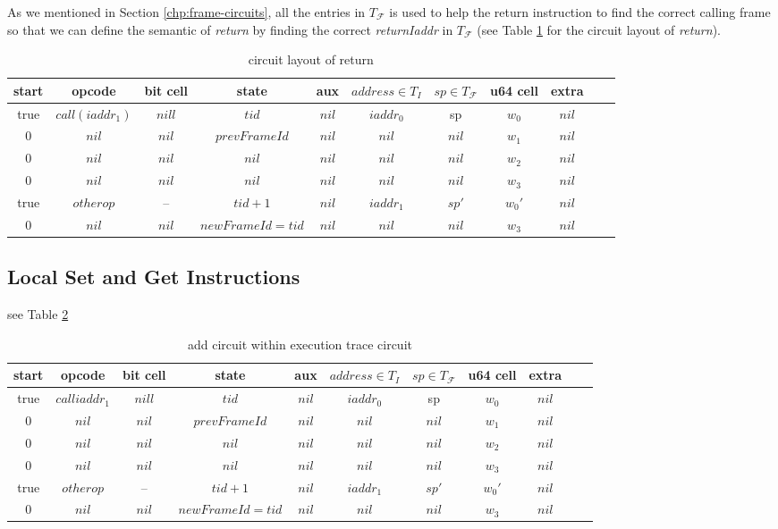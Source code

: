  As we mentioned in Section \ref{chp:frame-circuits}, all the entries in $T_\mathcal{F}$ is used to help the return instruction to find the correct calling frame so that we can define the semantic of \emph{return} by finding the correct \emph{returnIaddr} in $T_\mathcal{F}$ (see Table \ref{tbl:return-instruction} for the circuit layout of \emph{return}).
\begin{table}[!h]
\begin{center}
\begin{tabular}{ | c | c | c | c | c | c | c | c | c | c | c | }
  \hline
  start & opcode & bit cell & state & aux & $address \in T_{I}$ & $sp \in T_\mathcal{F}$& u64 cell & extra \\ 
  \hline
   true & $call(iaddr_1)$ & $nill$ & $tid$ & $nil$ & $iaddr_0$ & sp & $w_0$ & $nil$\\ 
 \hline
   0 & $nil$ & $nil$ & $prevFrameId$ & $nil$ & $nil$ & $nil$ & $w_1$ & $nil$\\ 
 \hline
   0 & $nil$ & $nil$ & $nil$ & $nil$ & $nil$ & $nil$ & $w_2$ & $nil$\\ 
 \hline
   0 & $nil$ & $nil$ & $nil$ & $nil$ & $nil$ & $nil$ & $w_3$ & $nil$\\ 
 \hline
   true & $otherop$ & -- & $tid + 1$ & $nil$ & $iaddr_1$ & $sp'$ & $w_0'$ & $nil$\\
 \hline
   0 & $nil$ & $nil$ & $newFrameId = tid$ & $nil$ & $nil$ & $nil$ & $w_3$ & $nil$\\ 
 \hline
\end{tabular}
\caption{circuit layout of return}
\label{tbl:return-instruction}
\end{center}
\end{table}
\subsection{Local Set and Get Instructions}
see Table \ref{tbl:local-setget-ins}
\begin{table}[!h]
\begin{center}
\begin{tabular}{ | c | c | c | c | c | c | c | c | c | c | c | }
  \hline
  start & opcode & bit cell & state & aux & $address \in T_{I}$ & $sp \in T_\mathcal{F}$& u64 cell & extra \\ 
  \hline
   true & $call iaddr_1$ & $nill$ & $tid$ & $nil$ & $iaddr_0$ & sp & $w_0$ & $nil$\\ 
 \hline
   0 & $nil$ & $nil$ & $prevFrameId$ & $nil$ & $nil$ & $nil$ & $w_1$ & $nil$\\ 
 \hline
   0 & $nil$ & $nil$ & $nil$ & $nil$ & $nil$ & $nil$ & $w_2$ & $nil$\\ 
 \hline
   0 & $nil$ & $nil$ & $nil$ & $nil$ & $nil$ & $nil$ & $w_3$ & $nil$\\ 
 \hline
   true & $otherop$ & -- & $tid + 1$ & $nil$ & $iaddr_1$ & $sp'$ & $w_0'$ & $nil$\\
 \hline
   0 & $nil$ & $nil$ & $newFrameId = tid$ & $nil$ & $nil$ & $nil$ & $w_3$ & $nil$\\ 
 \hline
\end{tabular}
\caption{add circuit within execution trace circuit}
\label{tbl:local-setget-ins}
\end{center}
\end{table}
